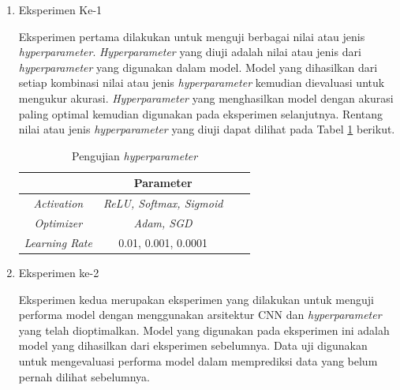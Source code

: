      \begin{enumerate}
  
        \item Eksperimen Ke-1

        Eksperimen pertama dilakukan untuk menguji berbagai nilai atau jenis \textit{hyperparameter}. \textit{Hyperparameter} yang diuji adalah nilai atau jenis dari \textit{hyperparameter} yang digunakan dalam model. Model yang dihasilkan dari setiap kombinasi nilai atau jenis \textit{hyperparameter} kemudian dievaluasi untuk mengukur akurasi. \textit{Hyperparameter} yang menghasilkan model dengan akurasi paling optimal kemudian digunakan pada eksperimen selanjutnya. Rentang nilai atau jenis \textit{hyperparameter} yang diuji dapat dilihat pada Tabel \ref{Pengujian Parameter} berikut.



            \begin{table}[h]
            \centering
            \caption{Pengujian \textit{hyperparameter}}
            \begin{tabular}{cccc}
                \toprule
                \textbf{} & \textbf{Parameter} \\
                \midrule
                      
                          \textit{Activation}  &  \textit{ReLU, Softmax, Sigmoid }\\
                         \textit{Optimizer} &  \textit{Adam, SGD} \\
                          \textit{Learning Rate} &  0.01, 0.001, 0.0001 \\
            
                \bottomrule
            \end{tabular}
            \label{Pengujian Parameter}
        \end{table}
        
        
        \item Eksperimen ke-2

        Eksperimen kedua merupakan eksperimen yang dilakukan untuk menguji performa model dengan menggunakan arsitektur CNN dan \textit{hyperparameter} yang telah dioptimalkan. Model yang digunakan pada eksperimen ini adalah model yang dihasilkan dari eksperimen sebelumnya. Data uji digunakan untuk mengevaluasi performa model dalam memprediksi data yang belum pernah dilihat sebelumnya.

        
       
    \end{enumerate}




